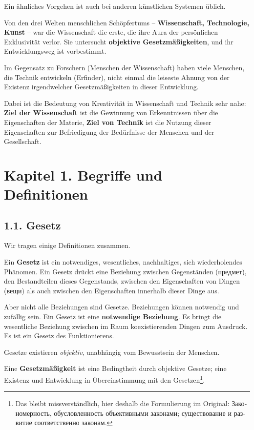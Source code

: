 \documentclass[11pt,a4paper]{article}
\begin{document}
Ein ähnliches Vorgehen ist auch bei anderen künstlichen Systemen üblich.

Von den drei Welten menschlichen Schöpfertums -- \textbf{Wissenschaft,
  Technologie, Kunst} -- war die Wissenschaft die erste, die ihre Aura der
persönlichen Exklusivität verlor. Sie untersucht \textbf{objektive
  Gesetzmäßigkeiten}, und ihr Entwicklungsweg ist vorbestimmt.

Im Gegensatz zu Forschern (Menschen der Wissenschaft) haben viele Menschen,
die Technik entwickeln (Erfinder), nicht einmal die leiseste Ahnung von der
Existenz irgendwelcher Gesetzmäßigkeiten in dieser Entwicklung.

Dabei ist die Bedeutung von Kreativität in Wissenschaft und Technik sehr nahe:
\textbf{Ziel der Wissenschaft} ist die Gewinnung von Erkenntnissen über die
Eigenschaften der Materie, \textbf {Ziel von Technik} ist die Nutzung dieser
Eigenschaften zur Befriedigung der Bedürfnisse der Menschen und der
Gesellschaft.

\section*{Kapitel 1. Begriffe und Definitionen}

\subsection*{1.1. Gesetz}

Wir tragen einige Definitionen zusammen.

Ein \textbf{Gesetz} ist ein notwendiges, wesentliches, nachhaltiges, sich
wiederholendes Phänomen. Ein Gesetz drückt eine Beziehung zwischen
Gegenständen (\foreignlanguage{russian}{предмет}), den Bestandteilen dieses
Gegenstands, zwischen den Eigenschaften von Dingen
(\foreignlanguage{russian}{вещи}) als auch zwischen den
Eigenschaften innerhalb dieser Dinge aus.  

Aber nicht alle Beziehungen sind Gesetze. Beziehungen können notwendig und
zufällig sein.  Ein Gesetz ist eine \textbf{notwendige Beziehung}. Es bringt
die wesentliche Beziehung zwischen im Raum koexistierenden Dingen zum
Ausdruck. Es ist ein Gesetz des Funktionierens.

Gesetze existieren \emph{objektiv}, unabhängig vom Bewusstsein der Menschen.

Eine \textbf{Gesetzmäßigkeit} ist eine Bedingtheit durch objektive Gesetze;
eine Existenz und Entwicklung in Übereinstimmung mit den Gesetzen\footnote{Das
  bleibt missverständlich, hier deshalb die Formulierung im Original:
  \foreignlanguage{russian}{Закономерность, обусловленность объективными
    законами; существование и развитие соответственно законам.}}.
\end{document}
